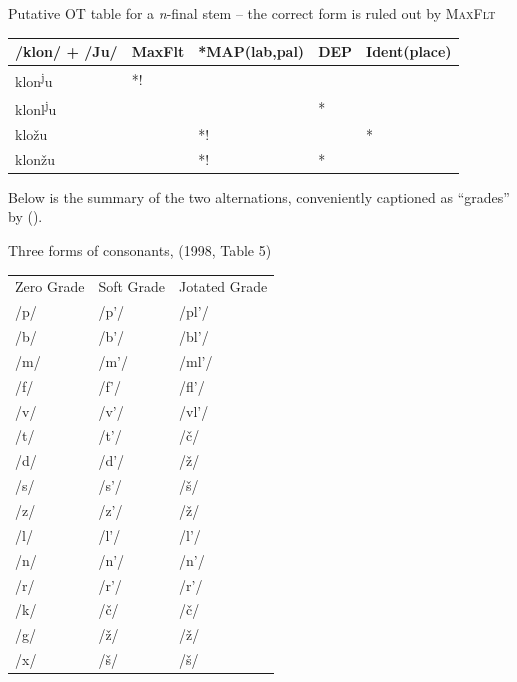 \documentclass[a4paper, 12pt]{article}
\newcommand{\citeay}[2][]{\citeauthor{#2} (\citeyear[#1]{#2})}
\begin{document}
	\ex\label{t:nOT} Putative OT table for a \textit{n}-final stem -- the correct form is ruled out by \textsc{MaxFlt}\\
\begin{tabular}{|l|l|l|l|l|}
\hline
/klon/ + /Ju/ & {\sc MaxFlt} & *MAP(lab,pal) & DEP & {\sc Ident}(place) \\ \hline
klon\textsuperscript{j}u      & *!     &               &     &              \\ \hline
\HandRight{} klonl\textsuperscript{j}u    &        &               & *   &              \\ \hline
kložu        &        & *!            &     & *            \\ \hline
klonžu               &        & *!            & *   &              \\ \hline
\end{tabular}
	\xe

	\noindent Below is the summary of the two alternations, conveniently captioned as ``grades'' by \citeay{brown1998}.
	
	\ex\label{t:threeforms} Three forms of consonants, \citeauthor{brown1998} (1998, Table 5) \\ 
\begin{tabular}{lll}
Zero Grade & Soft Grade & Jotated Grade \\
/p/        & /p'/       & /pl'/         \\
/b/        & /b'/       & /bl'/         \\
/m/        & /m'/       & /ml'/         \\
/f/        & /f'/       & /fl'/         \\
/v/        & /v'/       & /vl'/         \\
/t/        & /t'/       & /č/           \\
/d/        & /d'/       & /ž/           \\
/s/        & /s'/       & /š/           \\
/z/        & /z'/       & /ž/           \\
/l/        & /l'/       & /l'/          \\
/n/        & /n'/       & /n'/          \\
/r/        & /r'/       & /r'/          \\
/k/        & /č/        & /č/           \\
/g/        & /ž/        & /ž/      		\\
/x/        & /š/        & /š/          
\end{tabular}
	\xe
	
\end{document}
